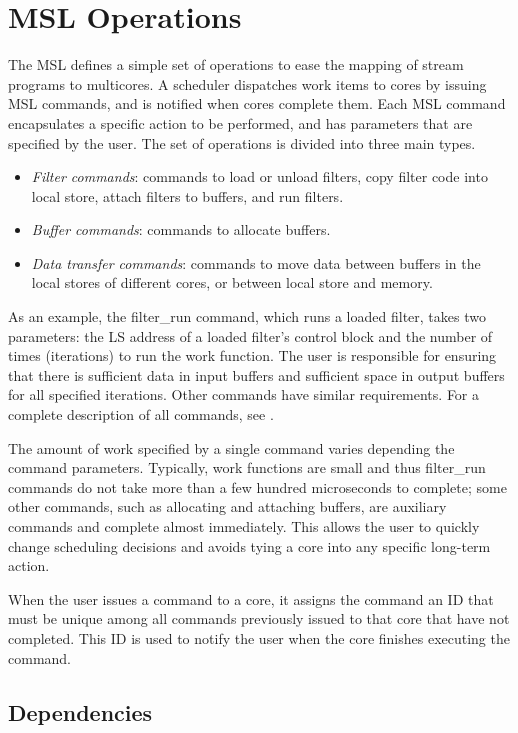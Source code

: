\section{MSL Operations}

The MSL defines a simple set of operations to ease the mapping of stream
programs to multicores. A scheduler dispatches work items to cores by
issuing MSL commands, and is notified when cores complete
them. Each MSL command encapsulates a specific action to be
performed, and has parameters that are specified by the user. The
set of operations is divided into three main types.
\begin{itemize}
\item {\it Filter commands}: commands to load or unload filters, copy filter code into local store, attach filters to buffers, and run filters.
\item {\it Buffer commands}: commands to allocate buffers.
\item {\it Data transfer commands}: commands to move data between buffers in the local stores of different cores, or between local store and memory.
\end{itemize}

As an example, the \textsf{filter\_run} command, which runs a loaded
filter, takes two parameters: the LS address of a loaded filter's
control block and the number of times (iterations) to run the work function.
The user is responsible for ensuring that there is sufficient
data in input buffers and sufficient space in output buffers for all
specified iterations. Other commands have similar requirements. For a
complete description of all commands, see \cite{dxzhang-meng-07}.

The amount of work specified by a single command varies depending the
command parameters. Typically, work functions are small and thus
\textsf{filter\_run} commands do not take more than a few hundred
microseconds to complete; some other commands, such as allocating and
attaching buffers, are auxiliary commands and complete almost
immediately. This allows the user to quickly change scheduling
decisions and avoids tying a core into any specific long-term action.

When the user issues a command to a core, it assigns the command an ID
that must be unique among all commands previously issued to that core
that have not completed. This ID is used to notify the user when the
core finishes executing the command.

\subsection{Dependencies}

